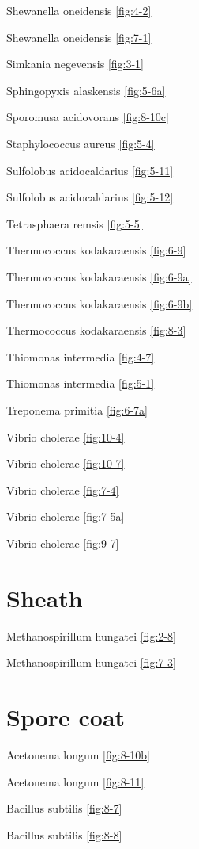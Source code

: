 \documentclass[]{tufte-book}
\begin{document}
Shewanella oneidensis \ref{fig:4-2}

Shewanella oneidensis \ref{fig:7-1}

Simkania negevensis \ref{fig:3-1}

Sphingopyxis alaskensis \ref{fig:5-6a}

Sporomusa acidovorans \ref{fig:8-10c}

Staphylococcus aureus \ref{fig:5-4}

Sulfolobus acidocaldarius \ref{fig:5-11}

Sulfolobus acidocaldarius \ref{fig:5-12}

Tetrasphaera remsis \ref{fig:5-5}

Thermococcus kodakaraensis \ref{fig:6-9}

Thermococcus kodakaraensis \ref{fig:6-9a}

Thermococcus kodakaraensis \ref{fig:6-9b}

Thermococcus kodakaraensis \ref{fig:8-3}

Thiomonas intermedia \ref{fig:4-7}

Thiomonas intermedia \ref{fig:5-1}

Treponema primitia \ref{fig:6-7a}

Vibrio cholerae \ref{fig:10-4}

Vibrio cholerae \ref{fig:10-7}

Vibrio cholerae \ref{fig:7-4}

Vibrio cholerae \ref{fig:7-5a}

Vibrio cholerae \ref{fig:9-7}

\section*{Sheath}\label{sheath}

Methanospirillum hungatei \ref{fig:2-8}

Methanospirillum hungatei \ref{fig:7-3}

\section*{Spore coat}\label{spore-coat}

Acetonema longum \ref{fig:8-10b}

Acetonema longum \ref{fig:8-11}

Bacillus subtilis \ref{fig:8-7}

Bacillus subtilis \ref{fig:8-8}
\end{document}
